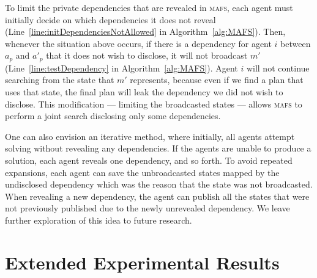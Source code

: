 \documentclass{article}
\newcommand{\mafs}{\textsc {mafs}\xspace}
\newcommand{\commentout}[1]{}
\theoremstyle{remark}
\begin{document}
To limit the private dependencies that are revealed in \mafs, each agent must initially decide on which dependencies it does not reveal (Line~\ref{line:initDependenciesNotAllowed} in Algorithm~\ref{alg:MAFS}). Then, whenever the situation above occurs, if there is a dependency for agent $i$ between $a_p$ and $a'_p$ that it does not wish to disclose, it will not broadcast $m'$ (Line~\ref{line:testDependency} in Algorithm~\ref{alg:MAFS}). Agent $i$ will not continue searching from the state that $m'$ represents, because even if we find a plan that uses that state, the final plan will leak the dependency we did not wish to disclose.\commentout{However, agent $i$ will continue searching from the state that $m'$ represents.}
This modification --- limiting the broadcasted states --- allows \mafs to perform a joint search disclosing only some dependencies.


One can also envision an iterative method, where initially, all agents attempt solving without revealing any dependencies. If the agents are unable to produce a solution, each agent reveals one dependency, and so forth.
To avoid repeated expansions, each agent can save the unbroadcasted states mapped by the undisclosed dependency which was the reason that the state was not broadcasted.  When revealing a new dependency, the agent can publish all  the states that were not previously published due to the newly unrevealed dependency. We leave further exploration of this idea to future research.



\section{Extended Experimental Results}
\end{document}
